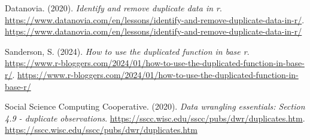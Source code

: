 \documentclass[
  man,
  floatsintext,
  longtable,
  nolmodern,
  notxfonts,
  notimes,
  colorlinks=true,linkcolor=blue,citecolor=blue,urlcolor=blue]{apa7}
\newlength{\cslhangindent}
\newenvironment{CSLReferences}[2] %
 {\begin{list}{}{%
  \setlength{\itemindent}{0pt}
  \setlength{\leftmargin}{0pt}
  \setlength{\parsep}{0pt}
  \ifodd #1
   \setlength{\leftmargin}{\cslhangindent}
   \setlength{\itemindent}{-1\cslhangindent}
  \fi
  \setlength{\itemsep}{#2\baselineskip}}}
 {\end{list}}
\begin{document}
\label{refs}
\begin{CSLReferences}{1}{0}
Datanovia. (2020). \emph{Identify and remove duplicate data in r}.
\url{https://www.datanovia.com/en/lessons/identify-and-remove-duplicate-data-in-r/}.
\url{https://www.datanovia.com/en/lessons/identify-and-remove-duplicate-data-in-r/}

Sanderson, S. (2024). \emph{How to use the duplicated function in base
r}.
\url{https://www.r-bloggers.com/2024/01/how-to-use-the-duplicated-function-in-base-r/}.
\url{https://www.r-bloggers.com/2024/01/how-to-use-the-duplicated-function-in-base-r/}

Social Science Computing Cooperative. (2020). \emph{Data wrangling
essentials: Section 4.9 - duplicate observations}.
\url{https://sscc.wisc.edu/sscc/pubs/dwr/duplicates.htm}.
\url{https://sscc.wisc.edu/sscc/pubs/dwr/duplicates.htm}

\end{CSLReferences}
\end{document}
